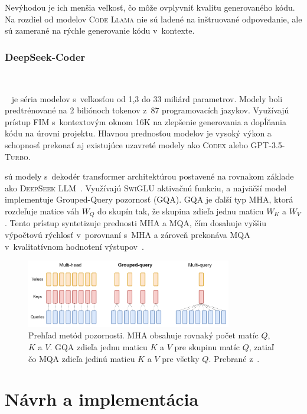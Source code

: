 Nevýhodou je ich menšia veľkosť, čo môže ovplyvniť kvalitu generovaného kódu. Na rozdiel od modelov \textsc{Code Llama} nie sú ladené na inštruované odpovedanie, ale sú zamerané na rýchle generovanie kódu v~kontexte.

\subsection{DeepSeek-Coder}~\label{sec:deepseekcoder}

\noindent\DSC{}~\cite{guo2024deepseekcoder} je séria modelov s~veľkosťou od 1,3 do 33 miliárd parametrov. Modely boli predtrénované na 2 biliónoch tokenov z~87 programovacích jazykov. Využívajú prístup FIM s~kontextovým oknom 16K na zlepšenie generovania a dopĺňania kódu na úrovni projektu. Hlavnou prednosťou modelov \DSC{} je vysoký výkon a schopnosť prekonať aj existujúce uzavreté modely ako \textsc{Codex} alebo \textsc{GPT-3.5-Turbo}.

\DSC{} sú modely s~dekodér transformer architektúrou postavené na rovnakom základe ako \textsc{DeepSeek LLM}~\cite{deepseekai2024deepseek}. Využívajú \textsc{SwiGLU} aktivačnú funkciu, a najväčší model implementuje Grouped-Query pozornosť (GQA). GQA je ďalší typ MHA, ktorá rozdeľuje matice váh $W_Q$ do skupín tak, že skupina zdieľa jednu maticu $W_K$ a $W_V$. Tento prístup syntetizuje prednosti MHA a MQA, čím dosahuje vyššiu výpočtovú rýchlosť v~porovnaní s~MHA a zároveň prekonáva MQA v~kvalitatívnom hodnotení výstupov~\cite{ainslie2023gqa}.

\begin{figure}[!ht]
    \centering
    \includegraphics[width=0.8\textwidth]{obrazky/GQA.png}
    \caption{Prehľad metód pozornosti. MHA obsahuje rovnaký počet matíc $Q$, $K$ a $V$. GQA zdieľa jednu maticu $K$ a $V$ pre skupinu matíc $Q$, zatiaľ čo MQA zdieľa jedinú maticu $K$ a $V$ pre všetky $Q$. Prebrané z~\cite{ainslie2023gqa}.}
    \label{fig:mha-mqa-gqa}
\end{figure}



\chapter{Návrh a implementácia}\label{chap:implementation}

